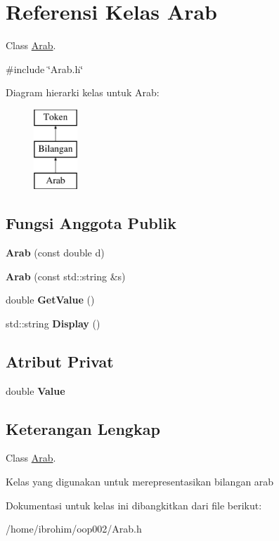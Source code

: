 \hypertarget{classArab}{}\section{Referensi Kelas Arab}
\label{classArab}


Class \hyperlink{classArab}{Arab}.  




{\ttfamily \#include \char`\"{}Arab.\+h\char`\"{}}

Diagram hierarki kelas untuk Arab\+:\begin{figure}[H]
\begin{center}
\leavevmode
\includegraphics[height=3.000000cm]{d0/d70/classArab}
\end{center}
\end{figure}
\subsection*{Fungsi Anggota Publik}
\begin{DoxyCompactItemize}
\item 
\hypertarget{classArab_add184fe39f6fc81d20f5b26d4b9758a3}{}{\bfseries Arab} (const double d)\label{classArab_add184fe39f6fc81d20f5b26d4b9758a3}

\item 
\hypertarget{classArab_a28e10b4e58b32730dce2a4f3f98a825e}{}{\bfseries Arab} (const std\+::string \&s)\label{classArab_a28e10b4e58b32730dce2a4f3f98a825e}

\item 
\hypertarget{classArab_ac0fb43a1da728805bec9add68fd46fa0}{}double {\bfseries Get\+Value} ()\label{classArab_ac0fb43a1da728805bec9add68fd46fa0}

\item 
\hypertarget{classArab_a96e515d21840b8ddfe50414505618200}{}std\+::string {\bfseries Display} ()\label{classArab_a96e515d21840b8ddfe50414505618200}

\end{DoxyCompactItemize}
\subsection*{Atribut Privat}
\begin{DoxyCompactItemize}
\item 
\hypertarget{classArab_a1f491a08c53d1f8b5450a0c8deefc1f4}{}double {\bfseries Value}\label{classArab_a1f491a08c53d1f8b5450a0c8deefc1f4}

\end{DoxyCompactItemize}


\subsection{Keterangan Lengkap}
Class \hyperlink{classArab}{Arab}. 

Kelas yang digunakan untuk merepresentasikan bilangan arab 

Dokumentasi untuk kelas ini dibangkitkan dari file berikut\+:\begin{DoxyCompactItemize}
\item 
/home/ibrohim/oop002/Arab.\+h\end{DoxyCompactItemize}
